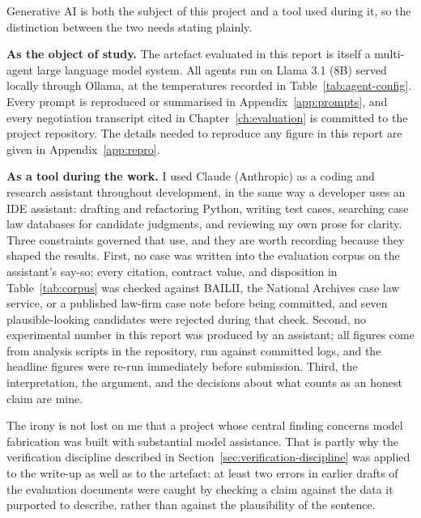 Generative AI is both the subject of this project and a tool used during it, so
the distinction between the two needs stating plainly.

\textbf{As the object of study.} The artefact evaluated in this report is itself a
multi-agent large language model system. All agents run on Llama 3.1 (8B) served
locally through Ollama, at the temperatures recorded in
Table~\ref{tab:agent-config}. Every prompt is reproduced or summarised in
Appendix~\ref{app:prompts}, and every negotiation transcript cited in
Chapter~\ref{ch:evaluation} is committed to the project repository. The details
needed to reproduce any figure in this report are given in
Appendix~\ref{app:repro}.

\textbf{As a tool during the work.} I used Claude (Anthropic) as a coding and
research assistant throughout development, in the same way a developer uses an IDE
assistant: drafting and refactoring Python, writing test cases, searching case law
databases for candidate judgments, and reviewing my own prose for clarity. Three
constraints governed that use, and they are worth recording because they shaped
the results. First, no case was written into the evaluation corpus on the
assistant's say-so; every citation, contract value, and disposition in
Table~\ref{tab:corpus} was checked against BAILII, the National Archives case law
service, or a published law-firm case note before being committed, and seven
plausible-looking candidates were rejected during that check. Second, no
experimental number in this report was produced by an assistant; all figures come
from analysis scripts in the repository, run against committed logs, and the
headline figures were re-run immediately before submission. Third, the
interpretation, the argument, and the decisions about what counts as an honest
claim are mine.

The irony is not lost on me that a project whose central finding concerns model
fabrication was built with substantial model assistance. That is partly why the
verification discipline described in Section~\ref{sec:verification-discipline} was
applied to the write-up as well as to the artefact: at least two errors in earlier
drafts of the evaluation documents were caught by checking a claim against the data
it purported to describe, rather than against the plausibility of the sentence.
